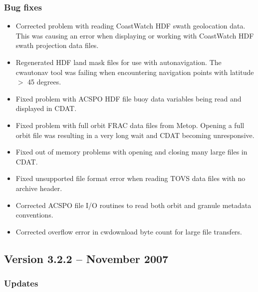 \subsubsection*{ Bug fixes}
\begin{itemize}

  \item Corrected problem with reading CoastWatch HDF swath
    geolocation data.  This was causing an error when displaying
    or working with CoastWatch HDF swath projection data files.

  \item Regenerated HDF land mask files for use with
    autonavigation.  The cwautonav tool was failing when
    encountering navigation points with latitude $>$ 45 degrees.

  \item Fixed problem with ACSPO HDF file buoy data variables
    being read and displayed in CDAT.

  \item Fixed problem with full orbit FRAC data files from Metop.
    Opening a full orbit file was resulting in a very long wait
    and CDAT becoming unresponsive.

  \item Fixed out of memory problems with opening and closing
    many large files in CDAT.

  \item Fixed unsupported file format error when reading TOVS
    data files with no archive header.

  \item Corrected ACSPO file I/O routines to read both orbit and
    granule metadata conventions.

  \item Corrected overflow error in cwdownload byte count for
    large file transfers.

\end{itemize}


\subsection*{Version 3.2.2 -- November 2007}

\subsubsection*{ Updates}


